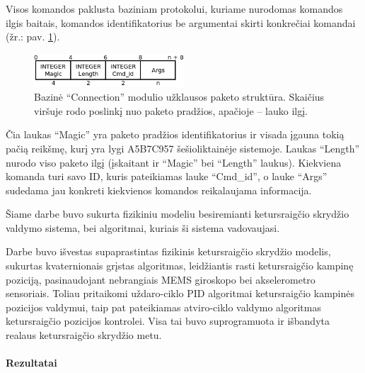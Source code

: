 \documentclass[12pt, a4paper, lithuanian, final]{article}
\begin{document}
Visos komandos paklusta baziniam protokolui, kuriame nurodomas komandos ilgis baitais, komandos identifikatorius be argumentai skirti konkrečiai komandai (žr.: pav. \ref{pav-cmd-proto}).

\begin{figure}[H]
\begin{center}
\includegraphics[width=0.5\textwidth]{img/basePacket.png}
\caption{Bazinė "`Connection"' modulio užklausos paketo struktūra. Skaičius viršuje rodo poslinkį nuo paketo pradžios, apačioje -- lauko ilgį.}
\label{pav-cmd-proto}
\end{center}
\end{figure}

Čia laukas "`Magic"' yra paketo pradžios identifikatorius ir visada įgauna tokią pačią reikšmę, kurį yra lygi A5B7C957 šešioliktainėje sistemoje.
Laukas "`Length"' nurodo viso paketo ilgį (įskaitant ir "`Magic"' bei "`Length"' laukus). Kiekviena komanda turi savo ID, kuris pateikiamas lauke "`Cmd\_id"', o lauke "`Args"' sudedama jau konkreti kiekvienos komandos reikalaujama informacija.







Šiame darbe buvo sukurta fizikiniu modeliu besiremianti ketursraigčio skrydžio valdymo sistema, bei algoritmai, kuriais ši sistema vadovaujasi.


Darbe buvo išvestas supaprastintas fizikinis ketursraigčio skrydžio modelis, sukurtas kvaternionais grįstas algoritmas, leidžiantis rasti ketursraigčio kampinę poziciją, pasinaudojant nebrangiais MEMS giroskopo bei akselerometro sensoriais.
Toliau pritaikomi uždaro-ciklo PID algoritmai ketursraigčio kampinės pozicijos valdymui, taip pat pateikiamas atviro-ciklo valdymo algoritmas ketursraigčio pozicijos kontrolei.
Visa tai buvo suprogramuota ir išbandyta realaus ketursraigčio skrydžio metu.


\paragraph{Rezultatai}
\end{document}

